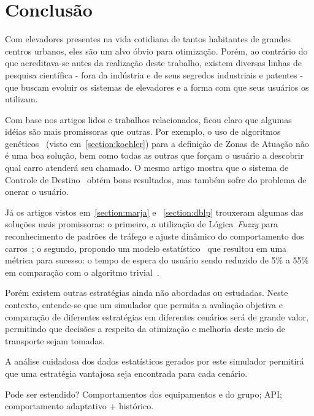 \chapter{\label{chap:conclusion}Conclusão}

Com elevadores presentes na vida cotidiana de tantos habitantes de grandes
centros urbanos, eles são um alvo óbvio para otimização. Porém, ao contrário do
que acreditava-se antes da realização deste trabalho, existem diversas linhas de
pesquisa científica - fora da indústria e de seus segredos industriais e
patentes - que buscam evoluir os sistemas de elevadores e a forma com que seus
usuários os utilizam.

Com base nos artigos lidos e trabalhos relacionados, ficou claro que algumas
idéias são mais promissoras que outras. Por exemplo, o uso de algoritmos
genéticos~\cite{KOEHLEROTTIGER02} (visto em~\ref{section:koehler}) para a
definição de Zonas de Atuação não é uma boa solução, bem como todas as outras
que forçam o usuário a descobrir qual carro atenderá seu chamado. O mesmo artigo
mostra que o sistema de Controle de Destino~\cite{KOEHLEROTTIGER02} obtém bons
resultados, mas também sofre do problema de onerar o usuário.

Já os artigos vistos em~\ref{section:marja} e ~\ref{section:dblp} trouxeram
algumas das soluções mais promissoras: o primeiro, a utilização de
Lógica~\textit{Fuzzy} para reconhecimento de padrões de tráfego e ajuste
dinâmico do comportamento dos carros~\cite{marja97}; o segundo, propondo um
modelo estatístico~\cite{DBLP:journals/corr/abs-1212-2499} que resultou em uma
métrica para sucesso: o tempo de espera do usuário sendo reduzido de 5\% a 55\%
em comparação com o algoritmo trivial~\cite{DBLP:journals/corr/abs-1212-2499}.

Porém existem outras estratégias ainda não abordadas ou estudadas. Neste
contexto, entende-se que um simulador que permita a avaliação objetiva e
comparação de diferentes estratégias em diferentes cenários será de grande
valor, permitindo que decisões a respeito da otimização e melhoria deste meio de
transporte sejam tomadas.

A análise cuidadosa dos dados estatísticos gerados por este simulador permitirá
que uma estratégia vantajosa seja encontrada para cada cenário.

{\color{red}Pode ser estendido? Comportamentos dos equipamentos e do grupo; API; comportamento adaptativo + histórico.}
